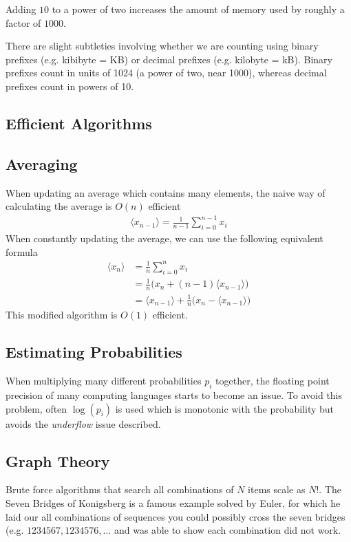 Adding $10$ to a power of two increases the amount of memory used by roughly a factor of $1000$.

There are slight subtleties involving whether we are counting using binary prefixes (e.g. kibibyte = KB) or decimal prefixes (e.g. kilobyte = kB). Binary prefixes count in units of 1024 (a power of two, near 1000), whereas decimal prefixes count in powers of 10. 

\subsection{Efficient Algorithms}

\subsection{Averaging}
When updating an average which contains many elements, the naive way of calculating the average is $O(n)$ efficient 
\begin{align}
	\langle x_{n-1}\rangle = \frac{1}{n-1}\sum_{i=0}^{n-1} x_i
\end{align}
When constantly updating the average, we can use the following equivalent formula
\begin{align}
	\langle x_{n}\rangle &= \frac{1}{n}\sum_{i=0}^{n} x_i\\
	&= \frac{1}{n}\Big(x_n + (n-1)\langle x_{n-1}\rangle\Big)\\
	&= \langle x_{n-1}\rangle + \frac{1}{n}\Big(x_n - \langle x_{n-1} \rangle\Big)
\end{align}
This modified algorithm is $O(1)$ efficient.

\subsection{Estimating Probabilities}
When multiplying many different probabilities $p_i$ together, the floating point precision of many computing languages starts to become an issue. To avoid this problem, often $\log(p_i)$ is used which is monotonic with the probability but avoids the \textit{underflow} issue described.

\subsection{Graph Theory}
Brute force algorithms that search all combinations of $N$ items scale as $N!$. The Seven Bridges of Konigsberg is a famous example solved by Euler, for which he laid our all combinations of sequences you could possibly cross the seven bridges (e.g. $1234567, 1234576,...$ and was able to show each combination did not work.


